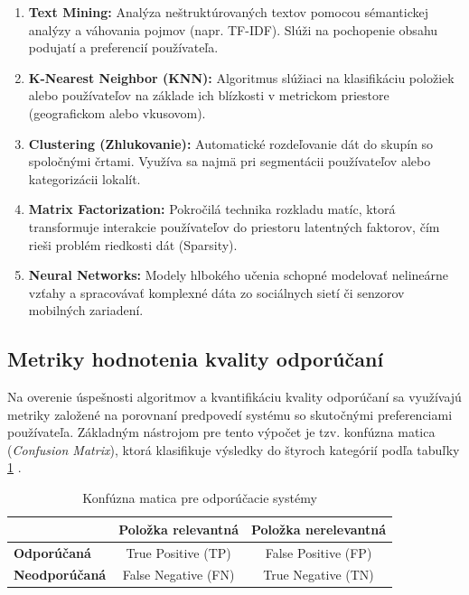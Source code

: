 \begin{enumerate}
    \item \textbf{Text Mining:} Analýza neštruktúrovaných textov pomocou sémantickej analýzy a váhovania pojmov (napr. TF-IDF). Slúži na pochopenie obsahu podujatí a preferencií používateľa.
    \item \textbf{K-Nearest Neighbor (KNN):} Algoritmus slúžiaci na klasifikáciu položiek alebo používateľov na základe ich blízkosti v metrickom priestore (geografickom alebo vkusovom).
    \item \textbf{Clustering (Zhlukovanie):} Automatické rozdeľovanie dát do skupín so spoločnými črtami. Využíva sa najmä pri segmentácii používateľov alebo kategorizácii lokalít.
    \item \textbf{Matrix Factorization:} Pokročilá technika rozkladu matíc, ktorá transformuje interakcie používateľov do priestoru latentných faktorov, čím rieši problém riedkosti dát (Sparsity).
    \item \textbf{Neural Networks:} Modely hlbokého učenia schopné modelovať nelineárne vzťahy a spracovávať komplexné dáta zo sociálnych sietí či senzorov mobilných zariadení.
\end{enumerate}

\subsection{Metriky hodnotenia kvality odporúčaní}
Na overenie úspešnosti algoritmov a kvantifikáciu kvality odporúčaní sa využívajú metriky založené na porovnaní predpovedí systému so skutočnými preferenciami používateľa. Základným nástrojom pre tento výpočet je tzv. konfúzna matica (\textit{Confusion Matrix}), ktorá klasifikuje výsledky do štyroch kategórií podľa tabuľky \ref{tab:confusion_matrix} \cite{electronics11010141}.

\begin{table}[ht]
\centering
\caption{Konfúzna matica pre odporúčacie systémy \cite{electronics11010141}}
\label{tab:confusion_matrix}
\begin{tabular}{|l|c|c|}
\hline
 & \textbf{Položka relevantná} & \textbf{Položka nerelevantná} \\ \hline
\textbf{Odporúčaná} & True Positive (TP) & False Positive (FP) \\ \hline
\textbf{Neodporúčaná} & False Negative (FN) & True Negative (TN) \\ \hline
\end{tabular}
\end{table}



